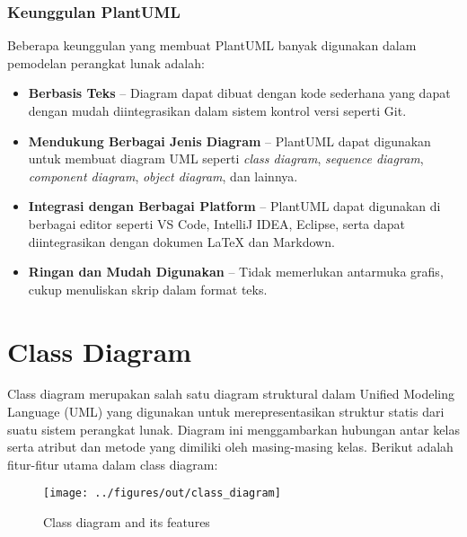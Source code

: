 \subsubsection{Keunggulan PlantUML}
Beberapa keunggulan yang membuat PlantUML banyak digunakan dalam pemodelan perangkat lunak adalah:
\begin{itemize}
	\item \textbf{Berbasis Teks} – Diagram dapat dibuat dengan kode sederhana yang dapat dengan mudah diintegrasikan dalam sistem kontrol versi seperti Git.
	\item \textbf{Mendukung Berbagai Jenis Diagram} – PlantUML dapat digunakan untuk membuat diagram UML seperti \textit{class diagram}, \textit{sequence diagram}, \textit{component diagram}, \textit{object diagram}, dan lainnya.
	\item \textbf{Integrasi dengan Berbagai Platform} – PlantUML dapat digunakan di berbagai editor seperti VS Code, IntelliJ IDEA, Eclipse, serta dapat diintegrasikan dengan dokumen LaTeX dan Markdown.
	\item \textbf{Ringan dan Mudah Digunakan} – Tidak memerlukan antarmuka grafis, cukup menuliskan skrip dalam format teks.
\end{itemize}



\section{Class Diagram}

Class diagram merupakan salah satu diagram struktural dalam Unified Modeling Language (UML) yang digunakan untuk merepresentasikan struktur statis dari suatu sistem perangkat lunak. Diagram ini menggambarkan hubungan antar kelas serta atribut dan metode yang dimiliki oleh masing-masing kelas. Berikut adalah fitur-fitur utama dalam class diagram:

\begin{figure}[ht]
	\centering
	\texttt{[image: ../figures/out/class\_diagram]}
	\caption{Class diagram and its features}
	\label{fig:class_diagram}
\end{figure}

